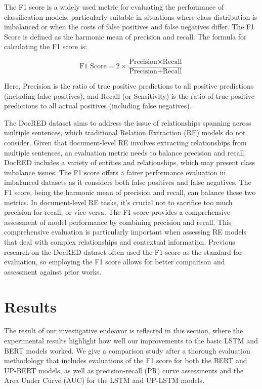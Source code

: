 \documentclass[conference]{IEEEtran}
\begin{document}
The F1 score is a widely used metric for evaluating the performance of classification models, particularly suitable in situations where class distribution is imbalanced or when the costs of false positives and false negatives differ.\cite{alma992984185801101631}
The F1 Score is defined as the harmonic mean of precision and recall. The formula for calculating the F1 score is:

\[ \text{F1 Score} = 2 \times \frac{\text{Precision} \times \text{Recall}}{\text{Precision} + \text{Recall}} \]

Here, Precision is the ratio of true positive predictions to all positive predictions (including false positives), and Recall (or Sensitivity) is the ratio of true positive predictions to all actual positives (including false negatives).

 The DocRED dataset aims to address the issue of relationships spanning across multiple sentences, which traditional Relation Extraction (RE) models do not consider. Given that document-level RE involves extracting relationships from multiple sentences, an evaluation metric needs to balance precision and recall. DocRED includes a variety of entities and relationships, which may present class imbalance issues. The F1 score offers a fairer performance evaluation in imbalanced datasets as it considers both false positives and false negatives.\cite{TanQingyu2022RD-A}
 The F1 score, being the harmonic mean of precision and recall, can balance these two metrics. In document-level RE tasks, it's crucial not to sacrifice too much precision for recall, or vice versa. The F1 score provides a comprehensive assessment of model performance by combining precision and recall. This comprehensive evaluation is particularly important when assessing RE models that deal with complex relationships and contextual information. Previous research on the DocRED dataset often used the F1 score as the standard for evaluation, so employing the F1 score allows for better comparison and assessment against prior works.

\section{Results}

The result of our investigative endeavor is reflected in this section, where the experimental results highlight how well our improvements to the basic LSTM and BERT models worked. We give a comparison study after a thorough evaluation methodology that includes evaluations of the F1 score for both the BERT and UP-BERT models, as well as precision-recall (PR) curve assessments and the Area Under Curve (AUC) for the LSTM and UP-LSTM models.
\end{document}
